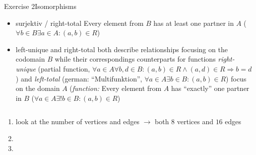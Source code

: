 \begin{frame}[allowframebreaks]{Exercise 2}{Isomorphisms}
\begin{requirementsnoinc}
\begin{itemize}
\begin{itemize}
        \item \alert{surjektiv / right-total} Every element from $B$ has \alert{at least} one partner in $A$ ($\forall b \in B \exists a \in A:(a, b) \in R$)
        \item \alert{left-unique} and \alert{right-total} both describe relationships focusing on the \alert{codomain} $B$ while their correspondings counterparts for functions \textit{right-unique } (partial function, $\forall a \in A \forall b, d \in B:(a, b) \in R \wedge(a, d) \in R \Rightarrow b=d$) and \textit{left-total } (german: \enquote{Multifunktion}, $\forall a \in A \exists b \in B:(a, b) \in R$) focus on the domain $A$ (\textit{function:} Every element from $A$ has \enquote{exactly} one partner in $B$ ($\forall a \in A \exists ! b \in B:(a, b) \in R$)
      \end{itemize}
    \end{itemize}
  \end{requirementsnoinc}
  \begin{solutionnoinc}
    \begin{columns}
      \begin{column}{0.5\textwidth}
      \end{column}
      \begin{column}{0.5\textwidth}
      \end{column}
    \end{columns}
    \vspace{0.5cm}
    \begin{enumerate}
      \item look at the \alert{number} of \alert{vertices} and \alert{edges} $\rightarrow$ both $8$ vertices and $16$ edges
      \item[]
      \item[]
    \end{enumerate}
  \end{solutionnoinc}
  \begin{solutionnoinc}
    \begin{columns}
      \begin{column}{0.5\textwidth}
      \end{column}
      \begin{column}{0.5\textwidth}
      \end{column}
    \end{columns}
    \vspace{0.5cm}

\end{solutionnoinc}
\end{frame}
